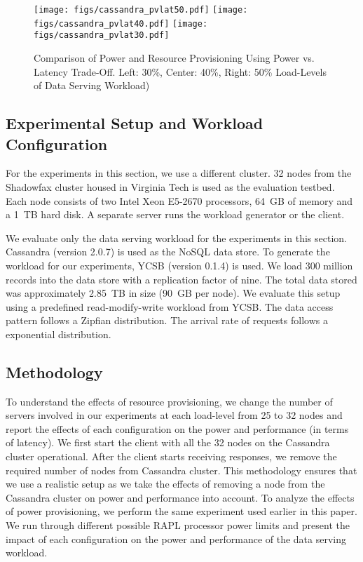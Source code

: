 \documentclass{sig-alternate}
\begin{document}
\begin{figure*}[t]
\centering
\texttt{[image: figs/cassandra\_pvlat50.pdf]}
\texttt{[image: figs/cassandra\_pvlat40.pdf]}
\texttt{[image: figs/cassandra\_pvlat30.pdf]}
\caption{Comparison of Power and Resource Provisioning Using Power vs. Latency 
Trade-Off. Left: 30\%, Center: 40\%, Right: 50\% Load-Levels of Data Serving Workload)}
\label{fig:ppvrp}
\end{figure*}

\subsection{Experimental Setup and Workload Configuration}

For the experiments in this section, we use a different cluster. 
32 nodes from the Shadowfax cluster housed in Virginia Tech is used as 
the evaluation testbed. Each node consists of two Intel Xeon E5-2670 processors, 
64~GB of memory and a 1~TB hard disk. A separate server
runs the workload generator or the client.

We evaluate only the data serving workload for the experiments in this section. 
Cassandra (version 2.0.7) is used as the NoSQL data store. To generate the workload for our experiments, 
YCSB (version 0.1.4) is used. We load 300 million records into the data store with
a replication factor of nine. The total data stored was 
approximately 2.85~TB in size (90~GB per node). We evaluate this setup 
using a predefined read-modify-write workload from YCSB. 
The data access pattern follows a Zipfian distribution. The arrival rate of requests follows a 
exponential distribution. 

\subsection{Methodology}

To understand the effects of resource provisioning, we change the number of 
servers involved in our experiments at each load-level from 25 to 32 nodes and report the 
effects of each configuration on the power and performance (in terms of latency). 
We first start the client with all 
the 32 nodes on the Cassandra cluster operational. After the client starts receiving responses, 
we remove the required number of nodes from Cassandra cluster. This methodology ensures 
that we use a realistic setup as we take the effects of removing a node from the Cassandra 
cluster on power and performance into account. To analyze the effects of 
power provisioning, we perform the same experiment used earlier in this paper. 
We run through different possible RAPL processor power limits and present the 
impact of each configuration on the power and performance of the data serving workload. 
\end{document}
